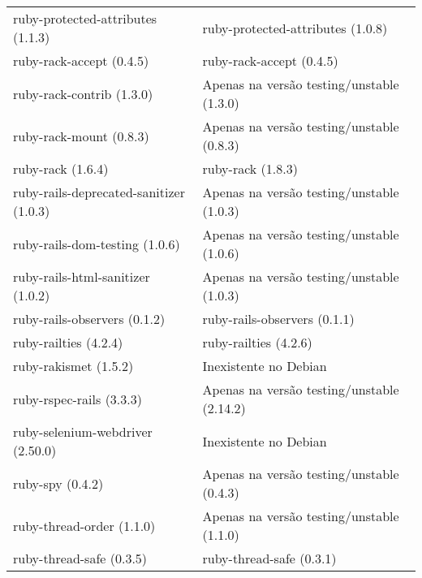 \begin{table}[h]
\begin{tabular}{l|l}
        ruby-protected-attributes (1.1.3)                & ruby-protected-attributes (1.0.8)                                  \\
        ruby-rack-accept (0.4.5)                         & ruby-rack-accept (0.4.5)                                  \\
        ruby-rack-contrib (1.3.0)                        & Apenas na versão testing/unstable (1.3.0)                                  \\
        ruby-rack-mount (0.8.3)                          & Apenas na versão testing/unstable (0.8.3)                                  \\
        ruby-rack (1.6.4)                                & ruby-rack (1.8.3)                                  \\
        ruby-rails-deprecated-sanitizer (1.0.3)          & Apenas na versão testing/unstable (1.0.3)                                  \\
        ruby-rails-dom-testing (1.0.6)                   & Apenas na versão testing/unstable (1.0.6)                                  \\
        ruby-rails-html-sanitizer (1.0.2)                & Apenas na versão testing/unstable (1.0.3)                                  \\
        ruby-rails-observers (0.1.2)                     & ruby-rails-observers (0.1.1)                                  \\
        ruby-railties (4.2.4)                            & ruby-railties (4.2.6)                                  \\
        ruby-rakismet (1.5.2)                            & Inexistente no Debian                                  \\
        ruby-rspec-rails (3.3.3)                         & Apenas na versão testing/unstable (2.14.2)                                  \\
        ruby-selenium-webdriver (2.50.0)                 & Inexistente no Debian                                  \\
        ruby-spy (0.4.2)                                 & Apenas na versão testing/unstable (0.4.3)                                  \\
        ruby-thread-order (1.1.0)                        & Apenas na versão testing/unstable (1.1.0)                                  \\
        ruby-thread-safe (0.3.5)                         & ruby-thread-safe (0.3.1)                                  \\

\end{tabular}
\end{table}
